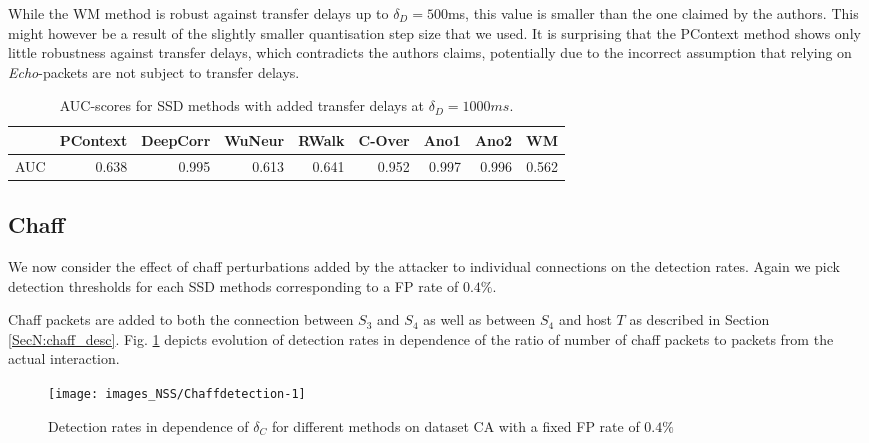 While the WM method is robust against transfer delays up to $\delta_D=500$ms, this value is smaller than the one claimed by the authors. This might however be a result of the slightly smaller quantisation step size that we used. It is surprising that the PContext method shows only little robustness against transfer delays, which contradicts the authors claims, potentially due to the incorrect assumption that relying on \textit{Echo}-packets are not subject to transfer delays.


\begin{table}
\small
\centering
\begin{tabular}{l|r|r|r|r|r|r|r|r}
  \hline
 & PContext & DeepCorr & WuNeur & RWalk & C-Over & Ano1 & Ano2 & WM \\ 
  \hline
AUC & 0.638 & 0.995 & 0.613 & 0.641 & 0.952 & 0.997 & 0.996 & 0.562 \\ 
   \hline
\end{tabular}

\caption{AUC-scores for SSD methods with added transfer delays at $\delta_D=1000ms$.}\label{tabN:AUCdelays}
\vspace{-0.6cm}
\end{table}



\subsection{Chaff}

We now consider the effect of chaff perturbations added by the attacker to individual connections on the detection rates. Again we pick detection thresholds for each SSD methods corresponding to a FP rate of $0.4\%$.%

Chaff packets are added to both the connection between $S_3$ and $S_4$ as well as between $S_4$ and host $T$ as described in Section \ref{SecN:chaff_desc}. Fig. \ref{figN:Chaffdetection} depicts evolution of detection rates in dependence of the ratio of number of chaff packets to packets from the actual interaction.

\begin{figure}
\texttt{[image: images\_NSS/Chaffdetection-1]} \caption[Detection rates in dependence of $\delta_C$ for different methods on dataset CA with a fixed FP rate of $0.4\%$]{Detection rates in dependence of $\delta_C$ for different methods on dataset CA with a fixed FP rate of $0.4\%$}\label{figN:Chaffdetection}
\end{figure}

